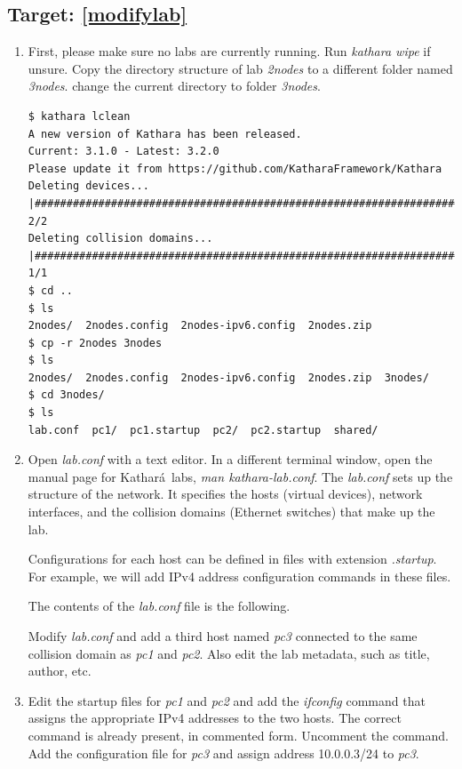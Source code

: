 \documentclass[12pt]{book}
\newcommand{\kathara}{Kathar\'a}
\begin{document}
\begin{enumerate}[label=\arabic*.]
\begin{enumerate}[resume*]
\end{enumerate}

\subsection{Target: \ref{modifylab}}

\begin{enumerate}[resume*]
\item First, please make sure no labs are currently running. Run \emph{kathara wipe} if unsure. Copy the directory structure of lab \emph{2nodes} to a different folder named \emph{3nodes}. change the current directory to folder \emph{3nodes}.

  \begin{lstlisting}
$ kathara lclean
A new version of Kathara has been released.
Current: 3.1.0 - Latest: 3.2.0
Please update it from https://github.com/KatharaFramework/Kathara
Deleting devices... |#####################################################################################| 2/2
Deleting collision domains... |###########################################################################| 1/1
$ cd ..
$ ls
2nodes/  2nodes.config  2nodes-ipv6.config  2nodes.zip
$ cp -r 2nodes 3nodes
$ ls
2nodes/  2nodes.config  2nodes-ipv6.config  2nodes.zip  3nodes/
$ cd 3nodes/
$ ls
lab.conf  pc1/  pc1.startup  pc2/  pc2.startup  shared/
  \end{lstlisting}

\item Open \emph{lab.conf} with a text editor. In a different terminal window, open the manual page for \kathara\ labs, \emph{man kathara-lab.conf}. The \emph{lab.conf} sets up the structure of the network. It specifies the hosts (virtual devices), network interfaces, and the collision domains (Ethernet switches) that make up the lab.

  Configurations for each host can be defined in files with extension \emph{.startup}. For example, we will add IPv4 address configuration commands in these files.

  The contents of the \emph{lab.conf} file is the following.

  

  Modify \emph{lab.conf} and add a third host named \emph{pc3} connected to the same collision domain as \emph{pc1} and \emph{pc2}. Also edit the lab metadata, such as title, author, etc.

\item Edit the startup files for \emph{pc1} and \emph{pc2} and add the \emph{ifconfig} command that assigns the appropriate IPv4 addresses to the two hosts. The correct command is already present, in commented form. Uncomment the command. Add the configuration file for \emph{pc3} and assign address 10.0.0.3/24 to \emph{pc3}.


\end{enumerate}
\end{enumerate}
\end{document}
